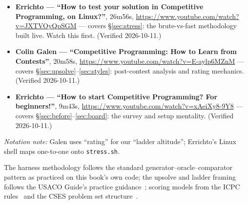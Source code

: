 \begin{rulebox}
\begin{itemize}
\item \textbf{Errichto --- ``How to test your solution in
Competitive Programming, on Linux?''}, 26m56s,
\url{https://www.youtube.com/watch?v=JXTVOyQpSGM} --- covers
\S\ref{sec:stress}: the brute-vs-fast methodology built live.
Watch this first. (Verified 2026-10-11.)
\item \textbf{Colin Galen --- ``Competitive Programming: How
to Learn from Contests''}, 20m58s,
\url{https://www.youtube.com/watch?v=E-aylp6MZnM} --- covers
\S\ref{sec:upsolve}--\ref{sec:styles}: post-contest analysis
and rating mechanics. (Verified 2026-10-11.)
\item \textbf{Errichto --- ``How to start Competitive
Programming? For beginners!''}, 9m43s,
\url{https://www.youtube.com/watch?v=xAeiXy8-9Y8} --- covers
\S\ref{sec:before}--\ref{sec:board}: the survey and setup
mentality. (Verified 2026-10-11.)
\end{itemize}
\emph{Notation note:} Galen uses ``rating'' for our ``ladder
altitude''; Errichto's Linux shell maps one-to-one onto
\texttt{stress.sh}.
\end{rulebox}
The harness methodology follows the standard
generator--oracle--comparator pattern as practiced on this
book's own code; the upsolve and ladder framing follows the
USACO Guide's practice guidance~\cite{usacoguide}; scoring
models from the ICPC rules~\cite{icpcrules} and the CSES
problem set structure~\cite{cses}.
